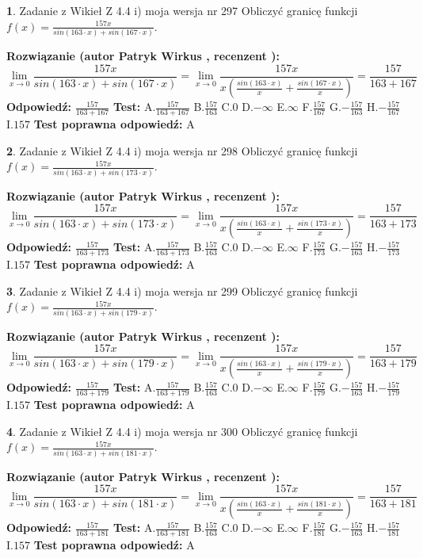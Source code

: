 \documentclass[12pt, a4paper]{article}
\theoremstyle{definition} %
\newtheorem{zad}{}
\newcommand{\zadStart}[1]{\begin{zad}#1\newline}
\newcommand{\zadStop}{\end{zad}}
\newcommand{\rozwStart}[2]{\noindent \textbf{Rozwiązanie (autor #1 , recenzent #2): }\newline}
\newcommand{\rozwStop}{\newline}
\newcommand{\odpStart}{\noindent \textbf{Odpowiedź:}\newline}
\newcommand{\odpStop}{\newline}
\newcommand{\testStart}{\noindent \textbf{Test:}\newline}
\newcommand{\testStop}{\newline}
\newcommand{\kluczStart}{\noindent \textbf{Test poprawna odpowiedź:}\newline}
\newcommand{\kluczStop}{\newline}
\begin{document}
\zadStart{Zadanie z Wikieł Z 4.4 i) moja wersja nr 297}
Obliczyć granicę funkcji $f(x)=\frac{157x}{sin(163\cdot x) +sin(167\cdot x)}$.
\zadStop
\rozwStart{Patryk Wirkus}{}
$$\lim\limits_{x\to 0}\frac{157x}{sin(163\cdot x) +sin(167\cdot x)}=\lim\limits_{x\to 0}\frac{157x}{x(\frac{sin(163\cdot x)}{x}+\frac{sin(167\cdot x)}{x})}=\frac{157}{163+167}$$
\rozwStop
\odpStart
$\frac{157}{163+167}$
\odpStop
\testStart
A.$\frac{157}{163+167}$
B.$\frac{157}{163}$
C.$0$
D.$-\infty$
E.$\infty$
F.$\frac{157}{167}$
G.$-\frac{157}{163}$
H.$-\frac{157}{167}$
I.$157$
\testStop
\kluczStart
A
\kluczStop



\zadStart{Zadanie z Wikieł Z 4.4 i) moja wersja nr 298}
Obliczyć granicę funkcji $f(x)=\frac{157x}{sin(163\cdot x) +sin(173\cdot x)}$.
\zadStop
\rozwStart{Patryk Wirkus}{}
$$\lim\limits_{x\to 0}\frac{157x}{sin(163\cdot x) +sin(173\cdot x)}=\lim\limits_{x\to 0}\frac{157x}{x(\frac{sin(163\cdot x)}{x}+\frac{sin(173\cdot x)}{x})}=\frac{157}{163+173}$$
\rozwStop
\odpStart
$\frac{157}{163+173}$
\odpStop
\testStart
A.$\frac{157}{163+173}$
B.$\frac{157}{163}$
C.$0$
D.$-\infty$
E.$\infty$
F.$\frac{157}{173}$
G.$-\frac{157}{163}$
H.$-\frac{157}{173}$
I.$157$
\testStop
\kluczStart
A
\kluczStop



\zadStart{Zadanie z Wikieł Z 4.4 i) moja wersja nr 299}
Obliczyć granicę funkcji $f(x)=\frac{157x}{sin(163\cdot x) +sin(179\cdot x)}$.
\zadStop
\rozwStart{Patryk Wirkus}{}
$$\lim\limits_{x\to 0}\frac{157x}{sin(163\cdot x) +sin(179\cdot x)}=\lim\limits_{x\to 0}\frac{157x}{x(\frac{sin(163\cdot x)}{x}+\frac{sin(179\cdot x)}{x})}=\frac{157}{163+179}$$
\rozwStop
\odpStart
$\frac{157}{163+179}$
\odpStop
\testStart
A.$\frac{157}{163+179}$
B.$\frac{157}{163}$
C.$0$
D.$-\infty$
E.$\infty$
F.$\frac{157}{179}$
G.$-\frac{157}{163}$
H.$-\frac{157}{179}$
I.$157$
\testStop
\kluczStart
A
\kluczStop



\zadStart{Zadanie z Wikieł Z 4.4 i) moja wersja nr 300}
Obliczyć granicę funkcji $f(x)=\frac{157x}{sin(163\cdot x) +sin(181\cdot x)}$.
\zadStop
\rozwStart{Patryk Wirkus}{}
$$\lim\limits_{x\to 0}\frac{157x}{sin(163\cdot x) +sin(181\cdot x)}=\lim\limits_{x\to 0}\frac{157x}{x(\frac{sin(163\cdot x)}{x}+\frac{sin(181\cdot x)}{x})}=\frac{157}{163+181}$$
\rozwStop
\odpStart
$\frac{157}{163+181}$
\odpStop
\testStart
A.$\frac{157}{163+181}$
B.$\frac{157}{163}$
C.$0$
D.$-\infty$
E.$\infty$
F.$\frac{157}{181}$
G.$-\frac{157}{163}$
H.$-\frac{157}{181}$
I.$157$
\testStop
\kluczStart
A
\kluczStop
\end{document}
